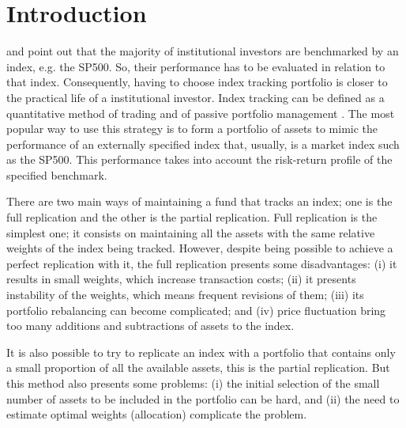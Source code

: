 \documentclass[preprint, doubleblind, authoryear,10pt]{elsarticle}
\begin{document}
\clearpage

\section{Introduction} \label{sec:intro}


\cite{tz2011} and \cite{liu-2009} point out that the majority of institutional investors are benchmarked by an index, e.g. the SP500.
So, their performance has to be evaluated in relation to that index.
Consequently, having to choose index tracking portfolio is closer to the practical life of a institutional investor.
Index tracking can be defined as a quantitative method of trading and of passive portfolio management \citep{PLS10, nnl14}.
The most popular way to use this strategy is to form a portfolio of assets to mimic the performance of an externally specified index that, usually, is a market index such as the SP500.
This performance takes into account the risk-return profile of the specified benchmark.

There are two main ways of maintaining a fund that tracks an index; one is the full replication and the other is the partial replication.
Full replication is the simplest one; it consists on maintaining all the assets with the same relative weights of the index being tracked.
However, despite being possible to achieve a perfect replication with it, the full replication presents some disadvantages:
(i) it results in small weights, which increase transaction costs;
(ii) it presents instability of the weights, which means frequent revisions of them;
(iii) its portfolio rebalancing can become complicated; 
and (iv) price fluctuation bring too many additions and subtractions of assets to the index.

It is also possible to try to replicate an index with a portfolio that contains only a small proportion of all the available assets, this is the partial replication.
But this method also presents some problems:
(i) the initial selection of the small number of assets to be included in the portfolio can be hard, and
(ii) the need to estimate optimal weights (allocation) complicate the problem.
\end{document}

